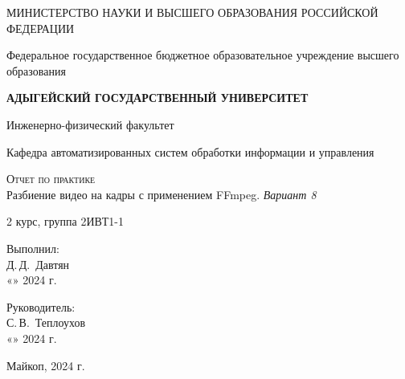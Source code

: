 \documentclass[12pt,a4paper]{scrartcl}
\begin{document}
 \begin{titlepage}
  \begin{center}
   \large
   МИНИСТЕРСТВО НАУКИ И ВЫСШЕГО ОБРАЗОВАНИЯ РОССИЙСКОЙ ФЕДЕРАЦИИ
   
   Федеральное государственное бюджетное образовательное учреждение высшего образования
   
   \textbf{АДЫГЕЙСКИЙ ГОСУДАРСТВЕННЫЙ УНИВЕРСИТЕТ}
   \vspace{0.25cm}
   
   Инженерно-физический факультет
   
   Кафедра автоматизированных систем обработки информации и управления
   \vfill

   \vfill
   
   \textsc{Отчет по практике}\\[5mm]
   
   {\LARGE Разбиение видео на кадры с применением FFmpeg. \textit{Вариант 8}}
   \bigskip
   
   2 курс, группа 2ИВТ1-1
  \end{center}
  \vfill
  
  \newlength{\ML}
  \hfill\begin{minipage}{0.5\textwidth}
   Выполнил:\\
   \underline{\hspace{\ML}} Д.\,Д.~Давтян\\
   «\underline{\hspace{0.7cm}}» \underline{\hspace{2cm}} 2024 г.
  \end{minipage}%
  \bigskip
  
  \hfill\begin{minipage}{0.5\textwidth}
   Руководитель:\\
   \underline{\hspace{\ML}} С.\,В.~Теплоухов\\
   «\underline{\hspace{0.7cm}}» \underline{\hspace{2cm}} 2024 г.
  \end{minipage}%
  \vfill
  
  \begin{center}
   Майкоп, 2024 г.
  \end{center}
 \end{titlepage}
 
\end{document}
